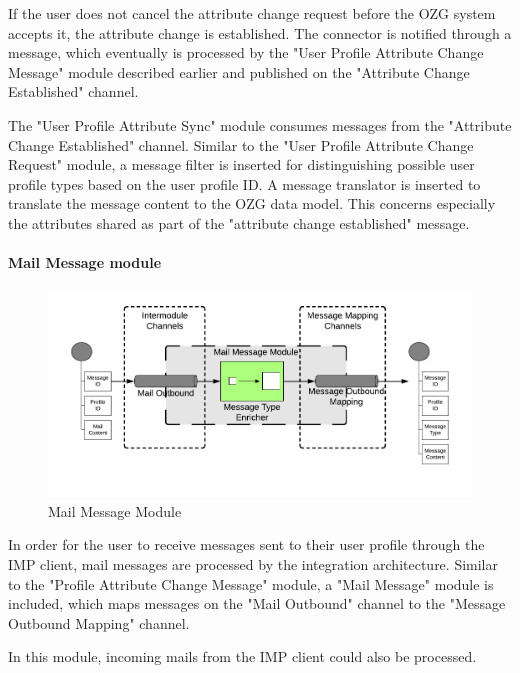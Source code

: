 If the user does not cancel the attribute change request before the OZG system accepts it, the attribute change is established. The connector is notified through a message, which eventually is processed by the "User Profile Attribute Change Message" module described earlier and published on the "Attribute Change Established" channel.

The "User Profile Attribute Sync" module consumes messages from the "Attribute Change Established" channel. Similar to the "User Profile Attribute Change Request" module, a message filter is inserted for distinguishing possible user profile types based on the user profile ID. A message translator is inserted to translate the message content to the OZG data model. This concerns especially the attributes shared as part of the "attribute change established" message.

\paragraph{Mail Message module}

\begin{figure}[h!]
    \centering
    \includegraphics[scale=0.6]{Diagrams/Integration Architecture 1/Technological Integration/14. Mail Message Module.pdf}
    \caption{Mail Message Module}
    \label{integration1:mail_message_module}
\end{figure}

In order for the user to receive messages sent to their user profile through the IMP client, mail messages are processed by the integration architecture. Similar to the "Profile Attribute Change Message" module, a "Mail Message" module is included, which maps messages on the "Mail Outbound" channel to the "Message Outbound Mapping" channel.

In this module, incoming mails from the IMP client could also be processed.

